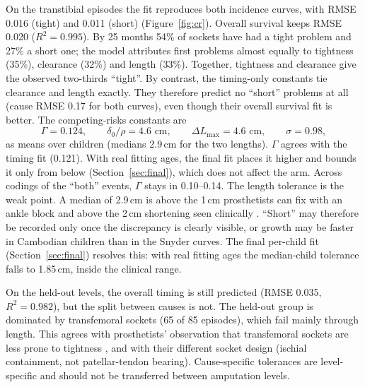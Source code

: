 \documentclass[11pt]{article}
\theoremstyle{definition}
\begin{document}
On the transtibial episodes the fit reproduces both incidence curves, with RMSE 0.016 (tight) and 0.011 (short) (Figure~\ref{fig:cr}). Overall survival keeps RMSE 0.020 ($R^2=0.995$). By 25 months 54\% of sockets have had a tight problem and 27\% a short one; the model attributes first problems almost equally to tightness (35\%), clearance (32\%) and length (33\%). Together, tightness and clearance give the observed two-thirds ``tight''. By contrast, the timing-only constants tie clearance and length exactly. They therefore predict no ``short'' problems at all (cause RMSE 0.17 for both curves), even though their overall survival fit is better. The competing-risks constants are
\[
\Gamma=0.124,\qquad \delta_0/\rho=4.6\text{ cm},\qquad \Delta L_{\max}=4.6\text{ cm},\qquad \sigma=0.98 ,
\]
as means over children (medians 2.9\,cm for the two lengths). $\Gamma$ agrees with the timing fit (0.121). With real fitting ages, the final fit places it higher and bounds it only from below (Section~\ref{sec:final}), which does not affect the arm. Across codings of the ``both'' events, $\Gamma$ stays in 0.10--0.14. The length tolerance is the weak point. A median of 2.9\,cm is above the 1\,cm prosthetists can fix with an ankle block and above the 2\,cm shortening seen clinically \cite{ghidini2025,ghidiniPoster}. ``Short'' may therefore be recorded only once the discrepancy is clearly visible, or growth may be faster in Cambodian children than in the Snyder curves. The final per-child fit (Section~\ref{sec:final}) resolves this: with real fitting ages the median-child tolerance falls to 1.85\,cm, inside the clinical range.

On the held-out levels, the overall timing is still predicted (RMSE 0.035, $R^2=0.982$), but the split between causes is not. The held-out group is dominated by transfemoral sockets (65 of 85 episodes), which fail mainly through length. This agrees with prosthetists' observation that transfemoral sockets are less prone to tightness \cite{ghidini2025}, and with their different socket design (ischial containment, not patellar-tendon bearing). Cause-specific tolerances are level-specific and should not be transferred between amputation levels.
\end{document}

